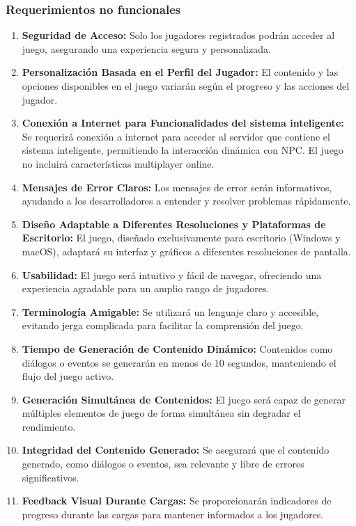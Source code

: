 \documentclass[12pt,twoside]{article}
\begin{document}
	\subsubsection{Requerimientos no funcionales}
	
	\begin{enumerate}[label=RNF\arabic*]
		\item \textbf{Seguridad de Acceso: }Solo los jugadores registrados podrán acceder al juego, asegurando una experiencia segura y personalizada.
		\item \textbf{Personalización Basada en el Perfil del Jugador: }El contenido y las opciones disponibles en el juego variarán según el progreso y las acciones del jugador.
		\item \textbf{Conexión a Internet para Funcionalidades del sistema inteligente: }Se requerirá conexión a internet para acceder al servidor que contiene el sistema inteligente, permitiendo la interacción dinámica con NPC. El juego no incluirá características multiplayer online.
		\item \textbf{Mensajes de Error Claros: }Los mensajes de error serán informativos, ayudando a los desarrolladores a entender y resolver problemas rápidamente.
		\item \textbf{Diseño Adaptable a Diferentes Resoluciones y Plataformas de Escritorio:} El juego, diseñado exclusivamente para escritorio (Windows y macOS), adaptará su interfaz y gráficos a diferentes resoluciones de pantalla.
		\item \textbf{Usabilidad: }El juego será intuitivo y fácil de navegar, ofreciendo una experiencia agradable para un amplio rango de jugadores.
		\item \textbf{Terminología Amigable: }Se utilizará un lenguaje claro y accesible, evitando jerga complicada para facilitar la comprensión del juego.
		\item \textbf{Tiempo de Generación de Contenido Dinámico:} Contenidos como diálogos o eventos se generarán en menos de 10 segundos, manteniendo el flujo del juego activo.
		\item \textbf{Generación Simultánea de Contenidos: }El juego será capaz de generar múltiples elementos de juego de forma simultánea sin degradar el rendimiento.
		\item \textbf{Integridad del Contenido Generado: }Se asegurará que el contenido generado, como diálogos o eventos, sea relevante y libre de errores significativos.
		\item \textbf{Feedback Visual Durante Cargas: }Se proporcionarán indicadores de progreso durante las cargas para mantener informados a los jugadores.

\end{enumerate}
\end{document}
